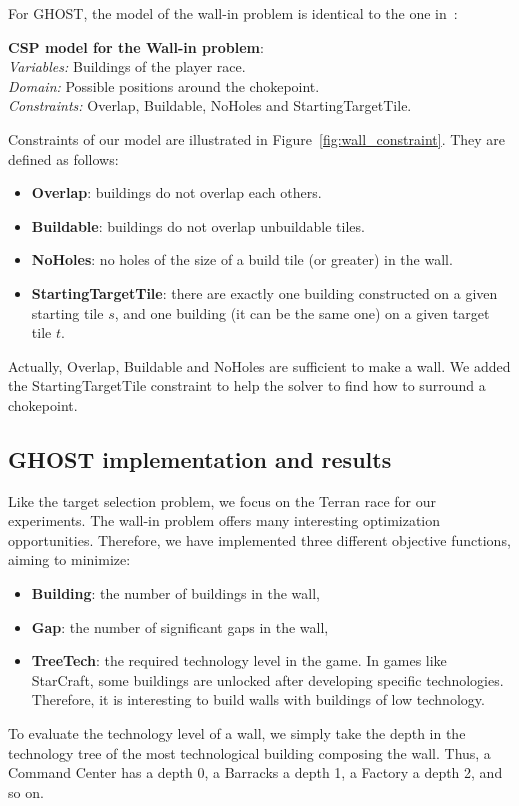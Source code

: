 \documentclass[journal]{IEEEtran}
\newcommand{\ghost}{\textsc{GHOST}\xspace}
\newcommand{\modelcsp}[4]%
{ \begin{trivlist}
  \item[]%
    \textbf{CSP model for #1}:\\
    \textit{Variables:} #2\\
    \textit{Domain:} #3\\
    \textit{Constraints:} #4
  \end{trivlist}%
}
\begin{document}
For \ghost, the  model of the wall-in problem is  identical to the one
in~\cite{RichouxUO14}:
\modelcsp{the Wall-in problem}%
{Buildings of the player race.}%
{Possible positions around the chokepoint.}%
{Overlap, Buildable, NoHoles and StartingTargetTile.}

Constraints     of      our     model     are      illustrated     in
Figure~\ref{fig:wall_constraint}. They are defined as follows:
\begin{itemize}
\item {\bf Overlap}: buildings do not overlap each others.
\item {\bf Buildable}: buildings do not overlap unbuildable tiles.
\item {\bf NoHoles}: no holes of the size of a build tile (or greater)
  in the wall.
\item  {\bf  StartingTargetTile}:  there   are  exactly  one  building
  constructed on a  given starting tile $s$, and one  building (it can
  be the same one) on a given target tile $t$.
\end{itemize}

Actually,  Overlap, Buildable  and NoHoles  are sufficient  to make  a
wall. We added the StartingTargetTile constraint to help the solver to
find how to surround a chokepoint.

\subsection{\ghost implementation and results}

Like the  target selection problem, we focus on  the Terran race
for our experiments.    The  wall-in  problem  offers   many  interesting
optimization  opportunities.   Therefore,  we have  implemented  three
different objective functions, aiming to minimize:
\begin{itemize}
\item {\bf Building}: the number of buildings in the wall,
\item {\bf Gap}: the number of significant gaps in the wall,
\item {\bf  TreeTech}: the required  technology level in the  game. In
  games  like  StarCraft,  some buildings are unlocked after developing specific  technologies.
  Therefore,  it is interesting to  build walls
  with buildings of low technology.
\end{itemize}

To evaluate the  technology level of a wall, we  simply take the depth
in the  technology tree of  the most technological  building composing
the wall. Thus, a Command Center has  a depth 0, a Barracks a depth 1,
a Factory a depth 2, and so on.
\end{document}
